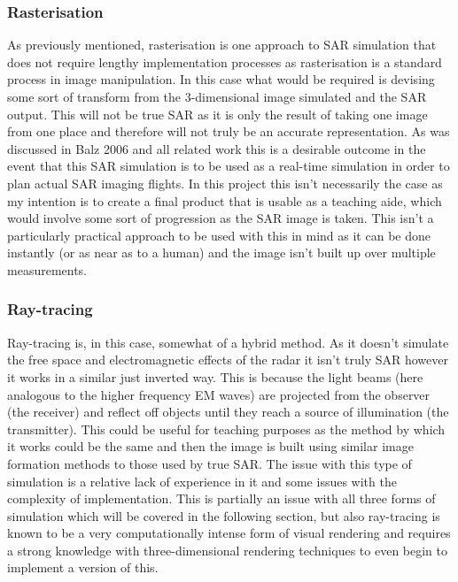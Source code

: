 \subsubsection{Rasterisation}
As previously mentioned, rasterisation is one approach to SAR simulation that does not require lengthy implementation processes as rasterisation is a standard process in image manipulation. In this case what would be required is devising some sort of transform from the 3-dimensional image simulated and the SAR output. This will not be true SAR as it is only the result of taking one image from one place and therefore will not truly be an accurate representation. As was discussed in Balz 2006 \cite{balzImprovedRealTimeSAR2006} and all related work this is a desirable outcome in the event that this SAR simulation is to be used as a real-time simulation in order to plan actual SAR imaging flights. In this project this isn't necessarily the case as my intention is to create a final product that is usable as a teaching aide, which would involve some sort of progression as the SAR image is taken. This isn't a particularly practical approach to be used with this in mind as it can be done instantly (or as near as to a human) and the image isn't built up over multiple measurements.
\subsubsection{Ray-tracing}
Ray-tracing is, in this case, somewhat of a hybrid method. As it doesn't simulate the free space and electromagnetic effects of the radar it isn't truly SAR however it works in a similar just inverted way. This is because the light beams (here analogous to the higher frequency EM waves) are projected from the observer (the receiver) and reflect off objects until they reach a source of illumination (the transmitter). This could be useful for teaching purposes as the method by which it works could be the same and then the image is built using similar image formation methods to those used by true SAR. The issue with this type of simulation is a relative lack of experience in it and some issues with the complexity of implementation. This is partially an issue with all three forms of simulation which will be covered in the following section, but also ray-tracing is known to be a very computationally intense form of visual rendering and requires a strong knowledge with three-dimensional rendering techniques to even begin to implement a version of this.

